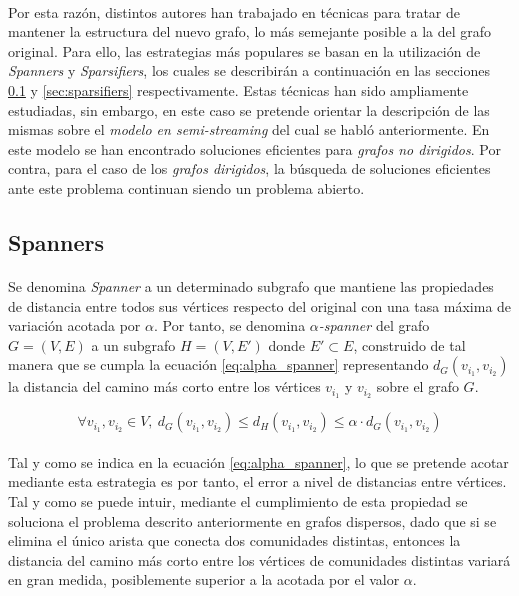\documentclass{subfiles}
\begin{document}
      \paragraph{}
      Por esta razón, distintos autores han trabajado en técnicas para tratar de mantener la estructura del nuevo grafo, lo más semejante posible a la del grafo original. Para ello, las estrategias más populares se basan en la utilización de \emph{Spanners} y \emph{Sparsifiers}, los cuales se describirán a continuación en las secciones \ref{sec:spanners} y \ref{sec:sparsifiers} respectivamente. Estas técnicas han sido ampliamente estudiadas, sin embargo, en este caso se pretende orientar la descripción de las mismas sobre el \emph{modelo en semi-streaming} del cual se habló anteriormente. En este modelo se han encontrado soluciones eficientes para \emph{grafos no dirigidos}. Por contra, para el caso de los \emph{grafos dirigidos}, la búsqueda de soluciones eficientes ante este problema continuan siendo un problema abierto.

      \subsection{Spanners}
      \label{sec:spanners}

        \paragraph{}
        Se denomina \emph{Spanner} a un determinado subgrafo que mantiene las propiedades de distancia entre todos sus vértices respecto del original con una tasa máxima de variación acotada por $\alpha$. Por tanto, se denomina \emph{$\alpha$-spanner} del grafo $G = (V, E)$ a un subgrafo $H = (V, E')$ donde $E' \subset E$, construido de tal manera que se cumpla la ecuación \eqref{eq:alpha_spanner} representando $d_G(v_{i_1},v_{i_2})$ la distancia del camino más corto entre los vértices $v_{i_1}$ y $v_{i_2}$ sobre el grafo $G$.

        \begin{equation}
        \label{eq:alpha_spanner}
          \forall v_{i_1}, v_{i_2} \in V, \ d_G(v_{i_1},v_{i_2}) \leq d_H(v_{i_1},v_{i_2}) \leq \alpha \cdot d_G(v_{i_1},v_{i_2})
        \end{equation}

        \paragraph{}
        Tal y como se indica en la ecuación \eqref{eq:alpha_spanner}, lo que se pretende acotar mediante esta estrategia es por tanto, el error a nivel de distancias entre vértices. Tal y como se puede intuir, mediante el cumplimiento de esta propiedad se soluciona el problema descrito anteriormente en grafos dispersos, dado que si se elimina el único arista que conecta dos comunidades distintas, entonces la distancia del camino más corto entre los vértices de comunidades distintas variará en gran medida, posiblemente superior a la acotada por el valor $\alpha$.
\end{document}
